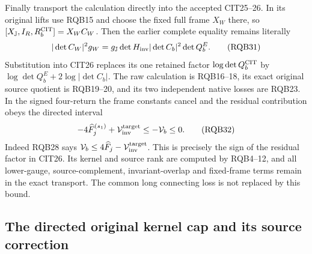 \documentclass[11pt,a4paper]{article}
\begin{document}
Finally transport the calculation directly into the accepted CIT25--26.
In its original lifts use RQB15 and choose the fixed full frame $X_W$
there, so $[X_{\mathbb J},I_R,R_b^{\rm CIT}]=X_WC_W$.
Then the earlier complete equality remains literally
\[
 |\det C_W|^2g_W
    =g_{\mathbb J}\det H_{\rm inv}
                         |\det C_b|^2\det Q_b^E .
 \tag{RQB31}
\]
Substitution into CIT26 replaces its one retained factor
$\log\det Q_b^{\rm CIT}$ by
$\log\det Q_b^E+2\log|\det C_b|$. The raw calculation is RQB16--18,
its exact original source quotient is RQB19--20, and its two
independent native losses are RQB23. In the signed four-return
the frame constants cancel and the residual contribution obeys
the directed interval
\[
 -4\widehat F_j^{(s_1)}
       +\mathcal V_{\rm inv}^{\rm target}
             \le-\mathcal V_b\le0 .
 \tag{RQB32}
\]
Indeed RQB28 says
$\mathcal V_b\le4\widehat F_j-\mathcal V_{\rm inv}^{\rm target}$.
This is precisely the sign of the residual factor in CIT26.
Its kernel and source rank are computed by RQB4--12, and all
lower-gauge, source-complement, invariant-overlap and fixed-frame
terms remain in the exact transport. The common long connecting
loss is not replaced by this bound.

\subsection{The directed original kernel cap and its source correction}
\end{document}
